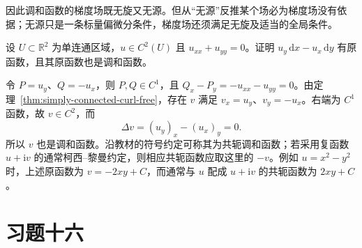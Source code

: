 因此调和函数的梯度场既无旋又无源。但从“无源”反推某个场必为梯度场没有依据；无源只是一条标量偏微分条件，梯度场还须满足无旋及适当的全局条件。

\begin{example}
\label{ex:harmonic-conjugate-potential}
设 $U\subset\mathbb R^2$ 为单连通区域，$u\in C^2(U)$ 且 $u_{xx}+u_{yy}=0$。证明 $u_y\,\mathrm dx-u_x\,\mathrm dy$ 有原函数，且其原函数也是调和函数。
\end{example}
\begin{solve}
令 $P=u_y$、$Q=-u_x$，则 $P,Q\in C^1$，且 $Q_x-P_y=-u_{xx}-u_{yy}=0$。由定理~\ref{thm:simply-connected-curl-free}，存在 $v$ 满足 $v_x=u_y$、$v_y=-u_x$。右端为 $C^1$ 函数，故 $v\in C^2$，而
\[
    \Delta v=(u_y)_x-(u_x)_y=0.
\]
所以 $v$ 也是调和函数。沿教材的符号约定可称其为共轭调和函数；若采用复函数 $u+\mathrm iv$ 的通常柯西--黎曼约定，则相应共轭函数应取这里的 $-v$。例如 $u=x^2-y^2$ 时，上述原函数为 $v=-2xy+C$，而通常与 $u$ 配成 $u+\mathrm iv$ 的共轭函数为 $2xy+C$。
\end{solve}



\section*{习题十六}
